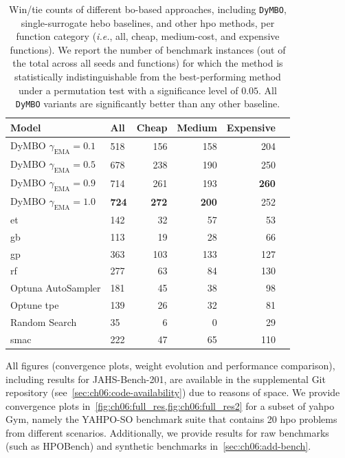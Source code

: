 \begin{table}[h]
\caption[Statistical win and tie counts by function cost]{
        Win/tie counts of different \gls{bo}-based approaches, including \texttt{DyMBO}, single-surrogate \gls{hebo} baselines, and other \gls{hpo} methods, per function category (\emph{i.e.}, all, cheap, medium-cost, and expensive functions).
        We report the number of benchmark instances (out of the total across all seeds and functions) for which the method is statistically indistinguishable from the best-performing method under a permutation test with a significance level of $0.05$. All \texttt{DyMBO} variants are significantly better than any other baseline.
        }
\label{tab:ch06:stat_signif}

    \centering


    \begin{tabular}{llrrrr}
\toprule
Model & All & Cheap & Medium & Expensive \\
\midrule
 DyMBO $\gamma_{\mathrm{EMA}}=0.1$ & 518 & 156 & 158 & 204 \\
 DyMBO $\gamma_{\mathrm{EMA}}=0.5$ & 678 & 238 & 190 & 250 \\
 DyMBO $\gamma_{\mathrm{EMA}}=0.9$ & 714 & 261 & 193 & \textbf{260} \\
 DyMBO $\gamma_{\mathrm{EMA}}=1.0$ & \textbf{724} & \textbf{272} & \textbf{200} & 252 \\
 \acrshort{et} & 142 & 32 & 57 & 53 \\
 \acrshort{gb} & 113 & 19 & 28 & 66 \\
 \acrshort{gp} & 363 & 103 & 133 & 127 \\
 \acrshort{rf} & 277 & 63 & 84 & 130 \\
 Optuna AutoSampler & 181 & 45 & 38 & 98 \\
 Optune \acrshort{tpe} & 139 & 26 & 32 & 81 \\
 Random Search & 35 & 6 & 0 & 29 \\
 \acrshort{smac} & 222 & 47 & 65 & 110 \\
\bottomrule
\end{tabular}

\end{table}

All figures (convergence plots, weight evolution and performance comparison), including results for JAHS-Bench-201, are available in the supplemental Git repository (see~\cref{sec:ch06:code-availability})
due to reasons of space.
We provide convergence plots in~\cref{fig:ch06:full_res,fig:ch06:full_res2} for a subset of \gls{yahpo} Gym, namely the YAHPO-SO benchmark suite that contains 20 \gls{hpo} problems from different scenarios.
Additionally, we provide results for raw benchmarks (such as HPOBench) and synthetic benchmarks in~\cref{sec:ch06:add-bench}.

